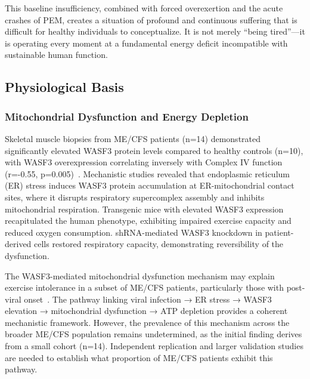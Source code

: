 This baseline insufficiency, combined with forced overexertion and the acute crashes of PEM, creates a situation of profound and continuous suffering that is difficult for healthy individuals to conceptualize. It is not merely ``being tired''---it is operating every moment at a fundamental energy deficit incompatible with sustainable human function.

\subsection{Physiological Basis}

\subsubsection{Mitochondrial Dysfunction and Energy Depletion}

\begin{observation}
\label{obs:wasf3-mito}
Skeletal muscle biopsies from ME/CFS patients (n=14) demonstrated significantly elevated WASF3 protein levels compared to healthy controls (n=10), with WASF3 overexpression correlating inversely with Complex IV function (r=-0.55, p=0.005)~\cite{wang2023wasf3}. Mechanistic studies revealed that endoplasmic reticulum (ER) stress induces WASF3 protein accumulation at ER-mitochondrial contact sites, where it disrupts respiratory supercomplex assembly and inhibits mitochondrial respiration. Transgenic mice with elevated WASF3 expression recapitulated the human phenotype, exhibiting impaired exercise capacity and reduced oxygen consumption. shRNA-mediated WASF3 knockdown in patient-derived cells restored respiratory capacity, demonstrating reversibility of the dysfunction.
\end{observation}

\begin{hypothesis}
\label{hyp:wasf3-subset}
The WASF3-mediated mitochondrial dysfunction mechanism may explain exercise intolerance in a subset of ME/CFS patients, particularly those with post-viral onset~\cite{wang2023wasf3,Syed2025}. The pathway linking viral infection → ER stress → WASF3 elevation → mitochondrial dysfunction → ATP depletion provides a coherent mechanistic framework. However, the prevalence of this mechanism across the broader ME/CFS population remains undetermined, as the initial finding derives from a small cohort (n=14). Independent replication and larger validation studies are needed to establish what proportion of ME/CFS patients exhibit this pathway.
\end{hypothesis}

